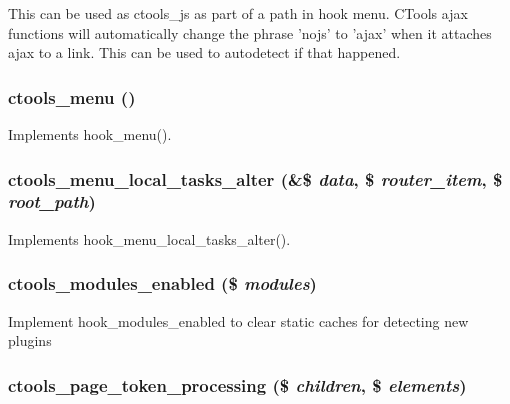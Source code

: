 This can be used as ctools\_\-js as part of a path in hook menu. CTools ajax functions will automatically change the phrase 'nojs' to 'ajax' when it attaches ajax to a link. This can be used to autodetect if that happened. \hypertarget{ctools_8module_a2385dc0b63f4409bfda5056b1954c6d5}{
\subsubsection[{ctools\_\-menu}]{\setlength{\rightskip}{0pt plus 5cm}ctools\_\-menu ()}}
\label{ctools_8module_a2385dc0b63f4409bfda5056b1954c6d5}
Implements hook\_\-menu(). \hypertarget{ctools_8module_a943750c628ffe3a20ece880e15a34240}{
\subsubsection[{ctools\_\-menu\_\-local\_\-tasks\_\-alter}]{\setlength{\rightskip}{0pt plus 5cm}ctools\_\-menu\_\-local\_\-tasks\_\-alter (\&\$ {\em data}, \/  \$ {\em router\_\-item}, \/  \$ {\em root\_\-path})}}
\label{ctools_8module_a943750c628ffe3a20ece880e15a34240}
Implements hook\_\-menu\_\-local\_\-tasks\_\-alter(). \hypertarget{ctools_8module_aaad6f0b6ff8fd26cc15837b2f9620c98}{
\subsubsection[{ctools\_\-modules\_\-enabled}]{\setlength{\rightskip}{0pt plus 5cm}ctools\_\-modules\_\-enabled (\$ {\em modules})}}
\label{ctools_8module_aaad6f0b6ff8fd26cc15837b2f9620c98}
Implement hook\_\-modules\_\-enabled to clear static caches for detecting new plugins \hypertarget{ctools_8module_ada3893e7993e19022048e2b47b413baa}{
\subsubsection[{ctools\_\-page\_\-token\_\-processing}]{\setlength{\rightskip}{0pt plus 5cm}ctools\_\-page\_\-token\_\-processing (\$ {\em children}, \/  \$ {\em elements})}}
